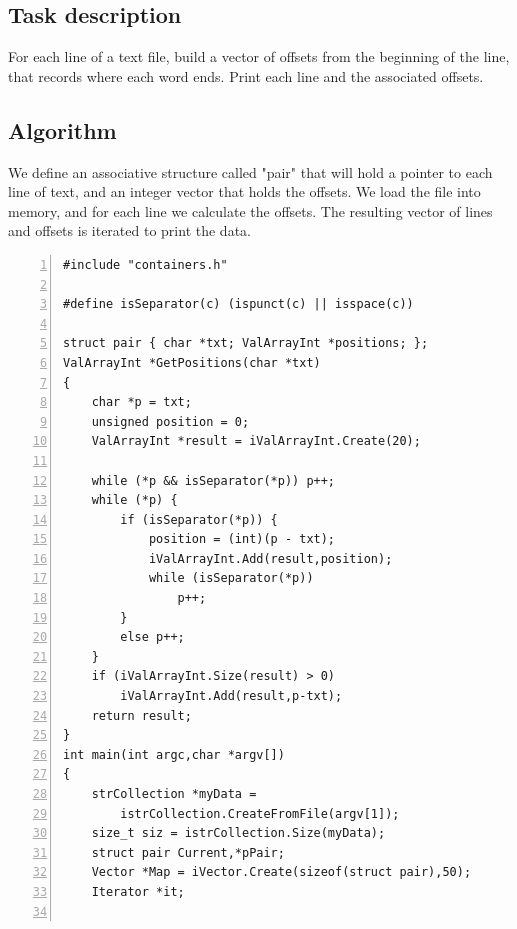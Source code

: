 \documentclass[12pt,a4paper]{memoir} %
\begin{document}
{{\subsection{Task description}
For each line of a text file, build a vector of offsets from the beginning of the line, that records where each word ends. Print each line and the associated offsets.
\subsection{Algorithm}
We define an associative structure called "pair" that will hold a pointer to each line of text, and an integer vector that holds the offsets.
We load the file into memory, and for each line we calculate the offsets. The resulting vector of lines and offsets is iterated to print the data.
\begin{Verbatim}[numbers=left]
#include "containers.h"

#define isSeparator(c) (ispunct(c) || isspace(c))

struct pair { char *txt; ValArrayInt *positions; };
ValArrayInt *GetPositions(char *txt)
{
    char *p = txt;
    unsigned position = 0;
    ValArrayInt *result = iValArrayInt.Create(20);

    while (*p && isSeparator(*p)) p++;
    while (*p) {
        if (isSeparator(*p)) {
            position = (int)(p - txt);
            iValArrayInt.Add(result,position);
            while (isSeparator(*p))
                p++;
        }   
        else p++;
    }   
    if (iValArrayInt.Size(result) > 0)  
        iValArrayInt.Add(result,p-txt);
    return result;
}
int main(int argc,char *argv[])
{
    strCollection *myData =
        istrCollection.CreateFromFile(argv[1]);
    size_t siz = istrCollection.Size(myData);
    struct pair Current,*pPair;
    Vector *Map = iVector.Create(sizeof(struct pair),50);
    Iterator *it;


\end{Verbatim}}}
\end{document}
